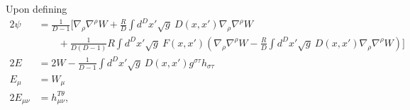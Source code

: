 \documentclass[10pt,letterpaper]{article}
\begin{document}
Upon defining
\begin{align}
2\psi &=  \frac{1}{D-1}\bigg[ \nabla_\rho \nabla^\rho W + \frac{R}{D} \int d^Dx' \sqrt{g}\ D(x,x')\nabla_\rho \nabla^\rho W 
\nonumber \\
&\qquad
+ \frac{1}{D(D-1)}R \int d^Dx' \sqrt{g}\ F(x,x') \left(\nabla_\rho \nabla^\rho W-\frac{R}{D}\int d^Dx' \sqrt{g}\ D(x,x')\nabla_\rho \nabla^\rho W\right)\bigg]
\nonumber\\
2E &= 2W - \frac{1}{D-1}  \int d^Dx' \sqrt{g}\ D(x,x') g^{\sigma\tau}h_{\sigma\tau}
\nonumber\\
E_\mu &= W_\mu
\nonumber\\
2 E_{\mu\nu} &= h^{T\theta}_{\mu\nu},
\end{align}
\end{document}
